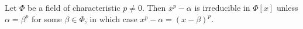 Let $\Phi$ be a field of characteristic $p \neq 0$. Then $x^p - \alpha$ is irreducible in $\Phi[x]$ unless $\alpha = \beta^p$ for some $\beta \in \Phi$, in which case $x^p - \alpha = (x - \beta)^p$.
